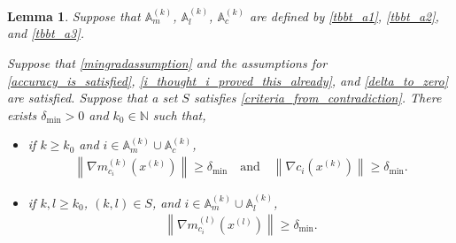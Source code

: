 \documentclass{article}
\newtheorem{lemma}[theorem]{Lemma}
\theoremstyle{case}
\numberwithin{theorem}{subsection}
\newcommand{\gmcik}{{\nabla m_{c_i}^{(k)}\left(\xk\right)}}
\newcommand{\gmcil}{{\nabla m_{c_i}^{(l)}\left(\xl\right)}}
\newcommand{\naturals}{\mathbb N}
\newcommand{\xk}{x^{(k)}}
\newcommand{\xl}{{x^{(l)}}}
\newcommand{\deltalb}{{\delta_{\textrm{min}}}}
\newcommand{\Amk}{{\mathbb A_m^{(k)}}}
\newcommand{\Alk}{{\mathbb A_l^{(k)}}}
\newcommand{\Ack}{{\mathbb A_c^{(k)}}}
\begin{document}
\begin{lemma}
\label{norm_of_active_constraints_bounded_below}
Suppose that $\Amk$, $\Alk$, $\Ack$
are defined by
\cref{tbbt_a1}, \cref{tbbt_a2}, and \cref{tbbt_a3}.

Suppose that
\cref{mingradassumption}
and the assumptions for
\cref{accuracy_is_satisfied}, \cref{i_thought_i_proved_this_already}, and \cref{delta_to_zero}
are satisfied.
Suppose that a set $S$ satisfies \cref{criteria_from_contradiction}.
There exists $\deltalb > 0$ and $k_0 \in \naturals$ such that,
\begin{itemize}
\item if $k \ge k_0$ and $i \in \Amk \cup \Ack$,
\begin{align*}
\left\|\gmcik\right\| \ge \deltalb \quad \textrm{and} \quad
\left\|\nabla c_i\left(\xk\right) \right\| \ge \deltalb.
\end{align*}
\item if $k, l \ge k_0$, $(k, l) \in S$, and $i \in \Amk \cup \Alk$,
\begin{align*}
\left\|\gmcil\right\| \ge \deltalb.
\end{align*}
\end{itemize}
\end{lemma}
\end{document}
